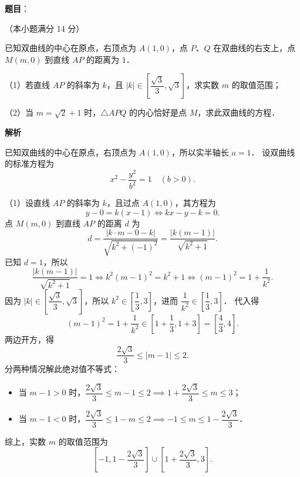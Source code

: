 \begin{answer}

\textbf{题目}：

（本小题满分 14 分）

已知双曲线的中心在原点，右顶点为 $A(1, 0)$，点 $P$、$Q$ 在双曲线的右支上，点 $M(m, 0)$ 到直线 $AP$ 的距离为 $1$．

（1）若直线 $AP$ 的斜率为 $k$，且 $|k| \in \left[\dfrac{\sqrt{3}}{3}, \sqrt{3}\right]$，求实数 $m$ 的取值范围；

（2）当 $m = \sqrt{2} + 1$ 时，$\triangle APQ$ 的内心恰好是点 $M$，求此双曲线的方程．

\textbf{解析}

已知双曲线的中心在原点，右顶点为 $A(1, 0)$，所以实半轴长 $a = 1$．
设双曲线的标准方程为
\nopagebreak[4]
\[
x^2 - \frac{y^2}{b^2} = 1 \quad (b > 0).
\]

（1）设直线 $AP$ 的斜率为 $k$，且过点 $A(1, 0)$，其方程为
\nopagebreak[4]
\[
y - 0 = k(x - 1) \iff kx - y - k = 0.
\]
点 $M(m, 0)$ 到直线 $AP$ 的距离 $d$ 为
\nopagebreak[4]
\[
d = \frac{|k \cdot m - 0 - k|}{\sqrt{k^2 + (-1)^2}} = \frac{|k(m - 1)|}{\sqrt{k^2 + 1}}.
\]
已知 $d = 1$，所以
\nopagebreak[4]
\[
\frac{|k(m - 1)|}{\sqrt{k^2 + 1}} = 1 \iff k^2 (m - 1)^2 = k^2 + 1 \iff (m - 1)^2 = 1 + \frac{1}{k^2}.
\]
因为 $|k| \in \left[\dfrac{\sqrt{3}}{3}, \sqrt{3}\right]$，所以 $k^2 \in \left[\dfrac{1}{3}, 3\right]$，进而 $\dfrac{1}{k^2} \in \left[\dfrac{1}{3}, 3\right]$．
代入得
\nopagebreak[4]
\[
(m - 1)^2 = 1 + \frac{1}{k^2} \in \left[1 + \frac{1}{3}, 1 + 3\right] = \left[\frac{4}{3}, 4\right].
\]
两边开方，得
\nopagebreak[4]
\[
\frac{2\sqrt{3}}{3} \leqslant |m - 1| \leqslant 2.
\]
分两种情况解此绝对值不等式：
\begin{itemize}
\item 当 $m - 1 > 0$ 时，$\dfrac{2\sqrt{3}}{3} \leqslant m - 1 \leqslant 2 \implies 1 + \dfrac{2\sqrt{3}}{3} \leqslant m \leqslant 3$；
\item 当 $m - 1 < 0$ 时，$\dfrac{2\sqrt{3}}{3} \leqslant 1 - m \leqslant 2 \implies -1 \leqslant m \leqslant 1 - \dfrac{2\sqrt{3}}{3}$．
\end{itemize}

综上，实数 $m$ 的取值范围为
\nopagebreak[4]
\[
\left[-1, 1 - \frac{2\sqrt{3}}{3}\right] \cup \left[1 + \frac{2\sqrt{3}}{3}, 3\right].
\]


\end{answer}
